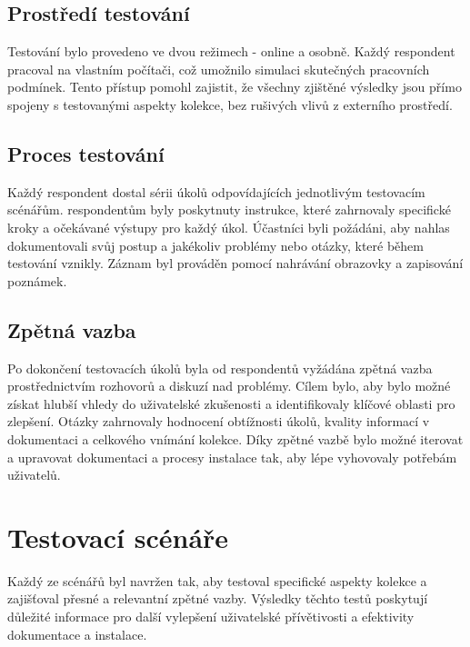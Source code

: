 \subsection{Prostředí testování}
Testování bylo provedeno ve dvou režimech - online a osobně. Každý respondent pracoval na vlastním počítači, což umožnilo simulaci skutečných pracovních podmínek. Tento přístup pomohl zajistit, že všechny zjištěné výsledky jsou přímo spojeny s testovanými aspekty kolekce, bez rušivých vlivů z externího prostředí.

\subsection{Proces testování}
Každý respondent dostal sérii úkolů odpovídajících jednotlivým testovacím scénářům. respondentům byly poskytnuty instrukce, které zahrnovaly specifické kroky a očekávané výstupy pro každý úkol. Účastníci byli požádáni, aby nahlas dokumentovali svůj postup a jakékoliv problémy nebo otázky, které během testování vznikly. Záznam byl prováděn pomocí nahrávání obrazovky a zapisování poznámek.

\subsection{Zpětná vazba}
Po dokončení testovacích úkolů byla od respondentů vyžádána zpětná vazba prostřednictvím rozhovorů a diskuzí nad problémy. Cílem bylo, aby bylo možné získat hlubší vhledy do uživatelské zkušenosti a identifikovaly klíčové oblasti pro zlepšení. Otázky zahrnovaly hodnocení obtížnosti úkolů, kvality informací v dokumentaci a celkového vnímání kolekce. Díky zpětné vazbě bylo možné iterovat a upravovat dokumentaci a procesy instalace tak, aby lépe vyhovovaly potřebám uživatelů.

\section{Testovací scénáře}
Každý ze scénářů byl navržen tak, aby testoval specifické aspekty kolekce a zajišťoval přesné a relevantní zpětné vazby. Výsledky těchto testů poskytují důležité informace pro další vylepšení uživatelské přívětivosti a efektivity dokumentace a instalace.


